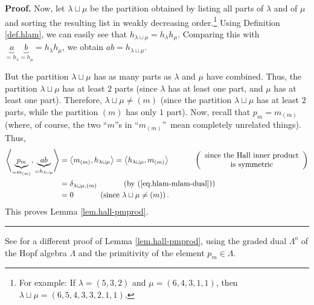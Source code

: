 \documentclass[numbers=enddot,12pt,final,onecolumn,notitlepage]{scrartcl}%
\theoremstyle{definition}
\newenvironment{proof}[1][Proof]{\noindent\textbf{#1.} }{\ \rule{0.5em}{0.5em}}
\newenvironment{vershort}{}{}
\begin{document}
\begin{vershort}
\begin{proof}
Now, let $\lambda\sqcup\mu$ be the partition obtained by listing all parts of
$\lambda$ and of $\mu$ and sorting the resulting list in weakly decreasing
order.\footnote{For example: If $\lambda=\left(  5,3,2\right)  $ and
$\mu=\left(  6,4,3,1,1\right)  $, then $\lambda\sqcup\mu=\left(
6,5,4,3,3,2,1,1\right)  $.} Using Definition \ref{def.hlam}, we can easily see
that $h_{\lambda\sqcup\mu}=h_{\lambda}h_{\mu}$. Comparing this with
$\underbrace{a}_{=h_{\lambda}}\underbrace{b}_{=h_{\mu}}=h_{\lambda}h_{\mu}$,
we obtain $ab=h_{\lambda\sqcup\mu}$.

But the partition $\lambda\sqcup\mu$ has as many parts as $\lambda$ and $\mu$
have combined. Thus, the partition $\lambda\sqcup\mu$ has at least $2$ parts
(since $\lambda$ has at least one part, and $\mu$ has at least one part).
Therefore, $\lambda\sqcup\mu\neq\left(  m\right)  $ (since the partition
$\lambda\sqcup\mu$ has at least $2$ parts, while the partition $\left(
m\right)  $ has only $1$ part). Now, recall that $p_{m}=m_{\left(  m\right)
}$ (where, of course, the two \textquotedblleft$m$\textquotedblright s in
\textquotedblleft$m_{\left(  m\right)  }$\textquotedblright\ mean completely
unrelated things). Thus,%
\begin{align*}
\left\langle \underbrace{p_{m}}_{=m_{\left(  m\right)  }},\underbrace{ab}%
_{=h_{\lambda\sqcup\mu}}\right\rangle  &  =\left\langle m_{\left(  m\right)
},h_{\lambda\sqcup\mu}\right\rangle =\left\langle h_{\lambda\sqcup\mu
},m_{\left(  m\right)  }\right\rangle \ \ \ \ \ \ \ \ \ \ \left(
\begin{array}
[c]{c}%
\text{since the Hall inner product}\\
\text{is symmetric}%
\end{array}
\right) \\
&  =\delta_{\lambda\sqcup\mu,\left(  m\right)  }\ \ \ \ \ \ \ \ \ \ \left(
\text{by (\ref{eq.hlam-mlam-dual})}\right) \\
&  =0\ \ \ \ \ \ \ \ \ \ \left(  \text{since }\lambda\sqcup\mu\neq\left(
m\right)  \right)  .
\end{align*}
This proves Lemma \ref{lem.hall-pmprod}.
\end{proof}

See \cite{verlong} for a different proof of Lemma \ref{lem.hall-pmprod}, using
the graded dual $\Lambda^{o}$ of the Hopf algebra $\Lambda$ and the
primitivity of the element $p_{m} \in\Lambda$.
\end{vershort}
\end{document}
